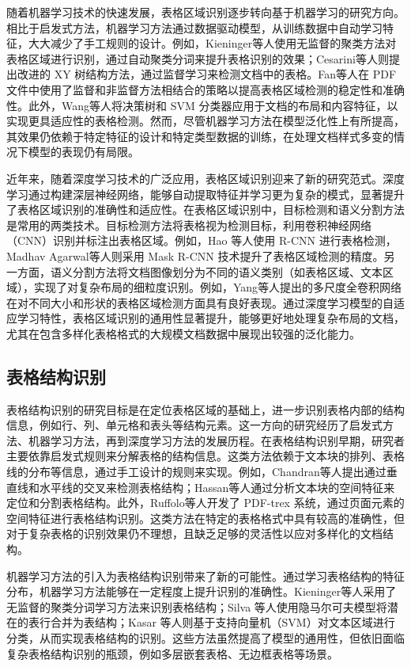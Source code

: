 \documentclass[UTF8,12pt, AutoFakeBold,fontset = founder]{ctexart}
\begin{document}
随着机器学习技术的快速发展，表格区域识别逐步转向基于机器学习的研究方向。相比于启发式方法，机器学习方法通过数据驱动模型，从训练数据中自动学习特征，大大减少了手工规则的设计。例如，Kieninger\cite{b1}等人使用无监督的聚类方法对表格区域进行识别，通过自动聚类分词来提升表格识别的效果；Cesarini\cite{b1}等人则提出改进的 XY 树结构方法，通过监督学习来检测文档中的表格。Fan\cite{b1}等人在 PDF 文件中使用了监督和非监督方法相结合的策略以提高表格区域检测的稳定性和准确性。此外，Wang\cite{b2}等人将决策树和 SVM 分类器应用于文档的布局和内容特征，以实现更具适应性的表格检测。然而，尽管机器学习方法在模型泛化性上有所提高，其效果仍依赖于特定特征的设计和特定类型数据的训练，在处理文档样式多变的情况下模型的表现仍有局限。

近年来，随着深度学习技术的广泛应用，表格区域识别迎来了新的研究范式。深度学习通过构建深层神经网络，能够自动提取特征并学习更为复杂的模式，显著提升了表格区域识别的准确性和适应性。在表格区域识别中，目标检测和语义分割方法是常用的两类技术。目标检测方法将表格视为检测目标，利用卷积神经网络（CNN）识别并标注出表格区域。例如，Hao 等人使用 R-CNN 进行表格检测，Madhav Agarwal\cite{b2}等人则采用 Mask R-CNN 技术提升了表格区域检测的精度。另一方面，语义分割方法将文档图像划分为不同的语义类别（如表格区域、文本区域），实现了对复杂布局的细粒度识别。例如，Yang\cite{b2}等人提出的多尺度全卷积网络在对不同大小和形状的表格区域检测方面具有良好表现。通过深度学习模型的自适应学习特性，表格区域识别的通用性显著提升，能够更好地处理复杂布局的文档，尤其在包含多样化表格格式的大规模文档数据中展现出较强的泛化能力。

\subsection{表格结构识别}

表格结构识别的研究目标是在定位表格区域的基础上，进一步识别表格内部的结构信息，例如行、列、单元格和表头等结构元素。这一方向的研究经历了启发式方法、机器学习方法，再到深度学习方法的发展历程。在表格结构识别早期，研究者主要依靠启发式规则来分解表格的结构信息。这类方法依赖于文本块的排列、表格线的分布等信息，通过手工设计的规则来实现。例如，Chandran\cite{b2}等人提出通过垂直线和水平线的交叉来检测表格结构；Hassan\cite{b2}等人通过分析文本块的空间特征来定位和分割表格结构。此外，Ruffolo\cite{b3}等人开发了 PDF-trex 系统，通过页面元素的空间特征进行表格结构识别。这类方法在特定的表格格式中具有较高的准确性，但对于复杂表格的识别效果仍不理想，且缺乏足够的灵活性以应对多样化的文档结构。

机器学习方法的引入为表格结构识别带来了新的可能性。通过学习表格结构的特征分布，机器学习方法能够在一定程度上提升识别的准确性。Kieninger\cite{b3}等人采用了无监督的聚类分词学习方法来识别表格结构；Silva 等人使用隐马尔可夫模型将潜在的表行合并为表结构；Kasar 等人则基于支持向量机（SVM）对文本区域进行分类，从而实现表格结构的识别。这些方法虽然提高了模型的通用性，但依旧面临复杂表格结构识别的瓶颈，例如多层嵌套表格、无边框表格等场景。
\end{document}

